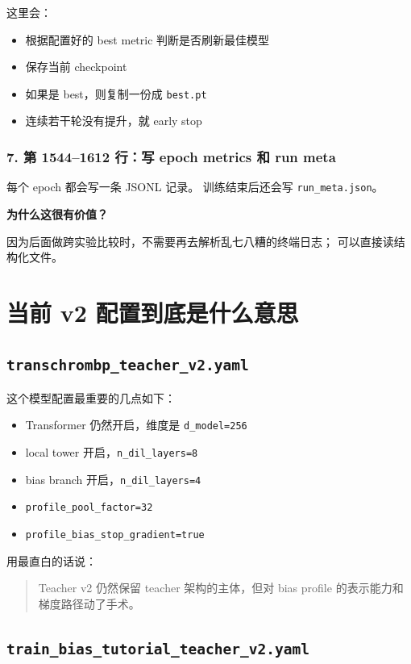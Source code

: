\documentclass[11pt,a4paper]{ctexart}
\begin{document}
这里会：

\begin{itemize}[leftmargin=2em]
\item 根据配置好的 best metric 判断是否刷新最佳模型
\item 保存当前 checkpoint
\item 如果是 best，则复制一份成 \texttt{best.pt}
\item 连续若干轮没有提升，就 early stop
\end{itemize}

\subsubsection*{7. 第 1544--1612 行：写 epoch metrics 和 run meta}

每个 epoch 都会写一条 JSONL 记录。
训练结束后还会写 \texttt{run\_meta.json}。

\textbf{为什么这很有价值？}

因为后面做跨实验比较时，不需要再去解析乱七八糟的终端日志；
可以直接读结构化文件。

\section{当前 v2 配置到底是什么意思}

\subsection{\texttt{transchrombp\_teacher\_v2.yaml}}

这个模型配置最重要的几点如下：

\begin{itemize}[leftmargin=2em]
\item Transformer 仍然开启，维度是 \texttt{d\_model=256}
\item local tower 开启，\texttt{n\_dil\_layers=8}
\item bias branch 开启，\texttt{n\_dil\_layers=4}
\item \texttt{profile\_pool\_factor=32}
\item \texttt{profile\_bias\_stop\_gradient=true}
\end{itemize}

用最直白的话说：

\begin{quote}
Teacher v2 仍然保留 teacher 架构的主体，但对 bias profile 的表示能力和梯度路径动了手术。
\end{quote}

\subsection{\texttt{train\_bias\_tutorial\_teacher\_v2.yaml}}
\end{document}
